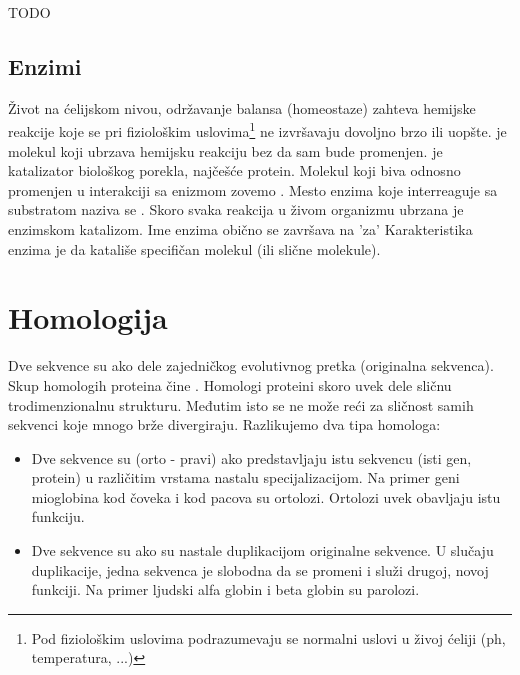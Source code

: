 TODO




\subsection{Enzimi}

Život na ćelijskom nivou, održavanje balansa (homeostaze) zahteva hemijske
reakcije koje se pri fiziološkim uslovima\footnote{Pod fiziološkim uslovima
podrazumevaju se normalni uslovi u živoj ćeliji (ph, temperatura, ...)} ne
izvršavaju dovoljno brzo ili uopšte.
 je molekul koji ubrzava hemijsku reakciju bez da sam bude
promenjen.  je katalizator biološkog porekla, najčešće protein.
Molekul koji biva  odnosno promenjen u interakciji sa
enizmom zovemo . Mesto enzima koje interreaguje sa
substratom naziva se .  Skoro svaka reakcija u živom
organizmu ubrzana je enzimskom katalizom. Ime enzima obično se završava na 'za'
Karakteristika enzima je da katališe specifičan molekul (ili slične molekule).

\section{Homologija}

Dve sekvence su  ako dele zajedničkog evolutivnog pretka
(originalna sekvenca). Skup homologih proteina čine . Homologi proteini skoro uvek dele sličnu trodimenzionalnu
strukturu. Međutim isto se ne može reći za sličnost samih sekvenci koje mnogo
brže divergiraju. Razlikujemo dva tipa homologa:
\begin{itemize}
  \item
    Dve sekvence su  (orto - pravi) ako predstavljaju istu
    sekvencu (isti gen, protein) u različitim vrstama nastalu specijalizacijom.
    Na primer geni mioglobina kod čoveka i kod pacova su ortolozi. Ortolozi
    uvek obavljaju istu funkciju.

  \item Dve sekvence su  ako su nastale duplikacijom
    originalne sekvence. U slučaju duplikacije, jedna sekvenca je slobodna
    da se promeni i služi drugoj, novoj funkciji. Na primer ljudski
    alfa globin i beta globin su parolozi.
\end{itemize}

